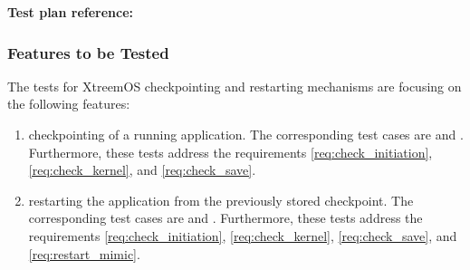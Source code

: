 

\noindent\textbf{Test plan reference: } %



\subsubsection{Features to be Tested}

The tests for XtreemOS checkpointing and restarting mechanisms are focusing on the following features:
\begin{enumerate}
	\item checkpointing of a running application. The corresponding test cases are  and . Furthermore, these tests address the requirements \ref{req:check_initiation}, \ref{req:check_kernel}, and \ref{req:check_save}.
	\item restarting the application from the previously stored checkpoint. The corresponding test cases are  and . Furthermore, these tests address the requirements \ref{req:check_initiation}, \ref{req:check_kernel}, \ref{req:check_save}, and \ref{req:restart_mimic}.
\end{enumerate}


